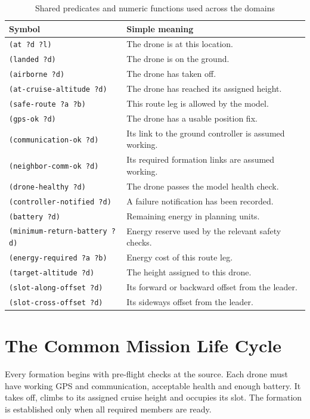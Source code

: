 \documentclass[11pt,a4paper,oneside]{report}
\newcommand{\cmd}[1]{\mbox{\texttt{#1}}}
\begin{document}
\begin{table}[H]
\caption[Shared PDDL vocabulary]{Shared predicates and numeric functions used across the domains}\label{tab:vocab}
\small
\begin{tabularx}{\textwidth}{@{}P{0.52\textwidth}Y@{}}
\toprule \textbf{Symbol} & \textbf{Simple meaning} \\ \midrule
\cmd{(at ?d ?l)} & The drone is at this location. \\
\cmd{(landed ?d)} & The drone is on the ground. \\
\cmd{(airborne ?d)} & The drone has taken off. \\
\cmd{(at-cruise-altitude ?d)} & The drone has reached its assigned height. \\
\cmd{(safe-route ?a ?b)} & This route leg is allowed by the model. \\
\cmd{(gps-ok ?d)} & The drone has a usable position fix. \\
\cmd{(communication-ok ?d)} & Its link to the ground controller is assumed working. \\
\cmd{(neighbor-comm-ok ?d)} & Its required formation links are assumed working. \\
\cmd{(drone-healthy ?d)} & The drone passes the model health check. \\
\cmd{(controller-notified ?d)} & A failure notification has been recorded. \\
\cmd{(battery ?d)} & Remaining energy in planning units. \\
\cmd{(minimum-return-battery ?d)} & Energy reserve used by the relevant safety checks. \\
\cmd{(energy-required ?a ?b)} & Energy cost of this route leg. \\
\cmd{(target-altitude ?d)} & The height assigned to this drone. \\
\cmd{(slot-along-offset ?d)} & Its forward or backward offset from the leader. \\
\cmd{(slot-cross-offset ?d)} & Its sideways offset from the leader. \\
\bottomrule\end{tabularx}
\end{table}

\section{The Common Mission Life Cycle}
Every formation begins with pre-flight checks at the source. Each drone must
have working GPS and communication, acceptable health and enough battery.
It takes off, climbs to its assigned cruise height and occupies its slot.
The formation is established only when all required members are ready.
\end{document}

